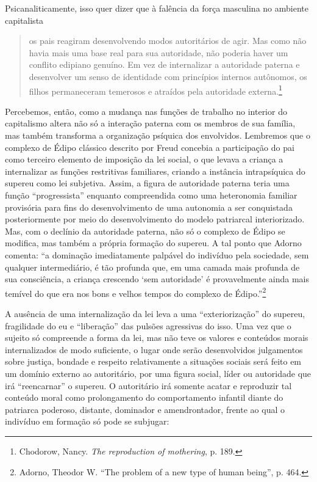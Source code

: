 Psicanaliticamente, isso quer dizer que à falência da força masculina no
ambiente capitalista

\begin{quote}
os pais reagiram desenvolvendo modos autoritários de agir. Mas como não
havia mais uma base real para sua autoridade, não poderia haver um
conflito edipiano genuíno. Em vez de internalizar a autoridade paterna e
desenvolver um senso de identidade com princípios internos autônomos, os
filhos permaneceram temerosos e atraídos pela autoridade
externa.\footnote{Chodorow, Nancy. \emph{The reproduction of mothering}, p. 189.}
\end{quote}

Percebemos, então, como a mudança nas funções de trabalho no interior do
capitalismo altera não só a interação paterna com os membros de sua
família, mas também transforma a organização psíquica dos envolvidos.
Lembremos que o complexo de Édipo clássico descrito por Freud concebia a
participação do pai como terceiro elemento de imposição da lei social, o
que levava a criança a internalizar as funções restritivas familiares,
criando a instância intrapsíquica do supereu como lei subjetiva. Assim,
a figura de autoridade paterna teria uma função ``progressista''
enquanto compreendida como uma heteronomia familiar provisória para fins
do desenvolvimento de uma autonomia a ser conquistada posteriormente por
meio do desenvolvimento do modelo patriarcal interiorizado. Mas, com o
declínio da autoridade paterna, não só o complexo de Édipo se modifica,
mas também a própria formação do supereu. A tal ponto que Adorno
comenta: ``a dominação
imediatamente palpável do indivíduo pela sociedade, sem qualquer
intermediário, é tão profunda que, em uma camada mais profunda de sua
consciência, a criança crescendo `sem autoridade' é provavelmente ainda
mais temível do que era nos bons e velhos tempos do complexo de
Édipo.''\footnote{Adorno, Theodor W. ``The problem of a new type of
  human being'', p. 464.}

A ausência de uma internalização da lei leva a uma ``exteriorização'' do
supereu, fragilidade do eu e ``liberação'' das pulsões agressivas do
isso. Uma vez que o sujeito só compreende a forma da lei, mas não teve
os valores e conteúdos morais internalizados de modo suficiente, o lugar
onde serão desenvolvidos julgamentos sobre justiça, bondade e respeito
relativamente a situações sociais será feito em um domínio externo ao
autoritário, por uma figura social, líder ou autoridade que irá
``reencarnar'' o supereu. O autoritário irá somente acatar e reproduzir
tal conteúdo moral como prolongamento do comportamento infantil diante
do patriarca poderoso, distante, dominador e amendrontador, frente ao
qual o indivíduo em formação só pode se subjugar:

